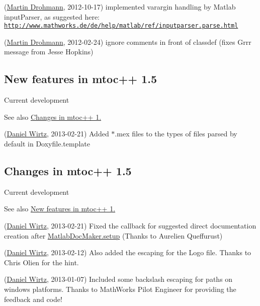 \begin{DoxyRefList}
(\hyperlink{developers_md}{Martin Drohmann}, 2012-\/10-\/17) implemented varargin handling by Matlab input\+Parser, as suggested here\+: \href{http://www.mathworks.de/de/help/matlab/ref/inputparser.parse.html}{\tt http\+://www.\+mathworks.\+de/de/help/matlab/ref/inputparser.\+parse.\+html}

(\hyperlink{developers_md}{Martin Drohmann}, 2012-\/02-\/24) ignore comments in front of classdef (fixes Grrr message from Jesse Hopkins)
\end{DoxyRefList}\hypertarget{newfeat1_5}{}\subsection{New features in mtoc++ 1.5}\label{newfeat1_5}
Current development

See also \hyperlink{changelog1_5}{Changes in mtoc++ 1.}


\begin{DoxyRefList}
\item[\label{newfeat1_5__newfeat1_5000001}%
\hypertarget{newfeat1_5__newfeat1_5000001}{}%
Page \hyperlink{changes}{Changes and new features in mtoc++} ](\hyperlink{developers_dw}{Daniel Wirtz}, 2013-\/02-\/21) Added \textquotesingle{}$\ast$.mex\textquotesingle{} files to the types of files parsed by default in Doxyfile.\+template
\end{DoxyRefList}\hypertarget{changelog1_5}{}\subsection{Changes in mtoc++ 1.5}\label{changelog1_5}
Current development

See also \hyperlink{newfeat1_5}{New features in mtoc++ 1.}


\begin{DoxyRefList}
\item[\label{changelog1_5__changelog1_5000001}%
\hypertarget{changelog1_5__changelog1_5000001}{}%
Class \hyperlink{class_matlab_doc_maker}{Matlab\+Doc\+Maker} ](\hyperlink{developers_dw}{Daniel Wirtz}, 2013-\/02-\/21) Fixed the callback for suggested direct documentation creation after \hyperlink{class_matlab_doc_maker_a434c176c2421dd18a40003919b19f4f2}{Matlab\+Doc\+Maker.\+setup} (Thanks to Aurelien Queffurust)

(\hyperlink{developers_dw}{Daniel Wirtz}, 2013-\/02-\/12) Also added the escaping for the Logo file. Thanks to Chris Olien for the hint.

(\hyperlink{developers_dw}{Daniel Wirtz}, 2013-\/01-\/07) Included some backslash escaping for paths on windows platforms. Thanks to Math\+Works Pilot Engineer \textquotesingle{} for providing the feedback and code!
\end{DoxyRefList}